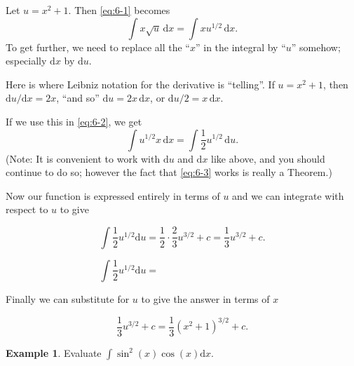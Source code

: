 \documentclass[
  11pt,
  oneside]{book}
\newcommand{\slide}{}
\theoremstyle{definition}
\theoremstyle{definition}
\newtheorem{example}{Example}[chapter]
\theoremstyle{definition}
\theoremstyle{definition}
\theoremstyle{remark}
\begin{document}
\slide

Let \(u = x^2+ 1\). Then \eqref{eq:6-1} becomes
\begin{equation}
\int x\sqrt{u}\,\mathrm{d}x=\int xu^{1/2}\,\mathrm{d}x.
\label{eq:6-2}
\end{equation}
To get further, we need to replace all the ``\(x\)'' in the integral by ``\(u\)'' somehow; especially \(\mathrm{d}x\) by \(\mathrm{d}u\).

Here is where Leibniz notation for the derivative is ``telling''.
If \(u = x^2+ 1\), then \(\mathrm{d}u/\mathrm{d}x = 2x\), ``and so'' \(\mathrm{d}u = 2x\,\mathrm{d}x\), or \(\mathrm{d}u/2 = x\,\mathrm{d}x\).

If we use this in \eqref{eq:6-2}, we get
\begin{equation}
\int u^{1/2}x\,\mathrm{d}x = \int\frac12u^{1/2}\,\mathrm{d}u.
\label{eq:6-3}
\end{equation}
(Note: It is convenient to work with \(\mathrm{d}u\) and \(\mathrm{d}x\) like above, and you should continue to do so; however the fact that \eqref{eq:6-3} works is really a Theorem.)

\slide

Now our function is expressed entirely in terms of \(u\) and we can integrate with respect to \(u\) to give

\begin{notslides}

\[
\int\frac12u^{1/2}\mathrm{d}u = \frac 12\cdot\frac23u^{3/2}+c = \frac13u^{3/2}+c.
\]

\end{notslides}

\begin{slidesonly}

\[
\int\frac12u^{1/2}\mathrm{d}u = \phantom{\frac 12\cdot\frac23u^{3/2}+c = \frac13u^{3/2}+c.}
\]

\end{slidesonly}

Finally we can substitute for \(u\) to give the answer in terms of \(x\)

\begin{notslides}

\[
\frac 13u^{3/2}+c = \frac13(x^2+1)^{3/2}+c.
\]

\end{notslides}

\slide

\begin{example}
Evaluate \(\displaystyle\int\sin^2(x)\cos(x)\mathrm{d}x\).
\end{example}
\end{document}
